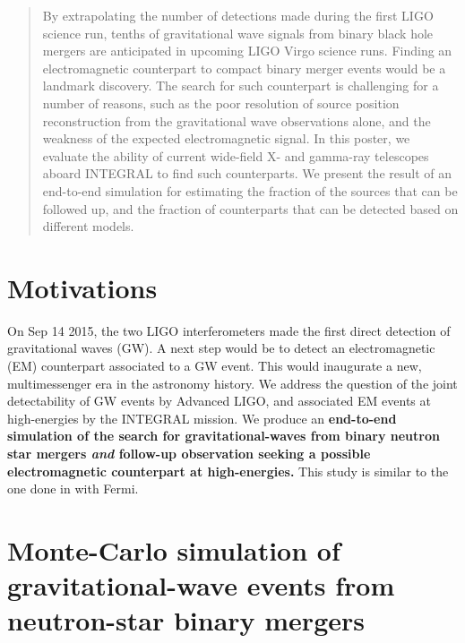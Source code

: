 \documentclass[a0,portrait]{a0poster}
\renewcommand{\emph}[1]{\textbf{\color{blue}#1}}
\begin{document}
\begin{multicols}{2} %


 \begin{abstract}
   By extrapolating the number of detections made during the first
   LIGO science run, tenths of gravitational wave signals from binary
   black hole mergers are anticipated in upcoming LIGO Virgo science
   runs. Finding an electromagnetic counterpart to compact binary
   merger events would be a landmark discovery. The search for such
   counterpart is challenging for a number of reasons, such as the
   poor resolution of source position reconstruction from the
   gravitational wave observations alone, and the weakness of the
   expected electromagnetic signal. In this poster, we evaluate the
   ability of current wide-field X- and gamma-ray telescopes aboard
   INTEGRAL to find such counterparts. We present the result of an
   end-to-end simulation for estimating the fraction of the sources
   that can be followed up, and the fraction of counterparts that can
   be detected based on different models.
 \end{abstract}


\section*{Motivations}

On Sep 14 2015, the two LIGO interferometers made the first direct detection of
gravitational waves (GW). A next step would be to detect an electromagnetic (EM)
counterpart associated to a GW event. This would inaugurate a new,
multimessenger era in the astronomy history. We address the question of the
joint detectability of GW events by Advanced LIGO, and
associated EM events at high-energies by the INTEGRAL mission. We produce an
\emph{end-to-end simulation of the search for gravitational-waves from binary
  neutron star mergers \textit{and} follow-up observation seeking a possible
  electromagnetic counterpart at high-energies.} This study is similar to the
one done in \cite{2016arXiv160606124P} with Fermi.

\section*{Monte-Carlo simulation of gravitational-wave events from neutron-star binary mergers}


\end{multicols}
\end{document}
